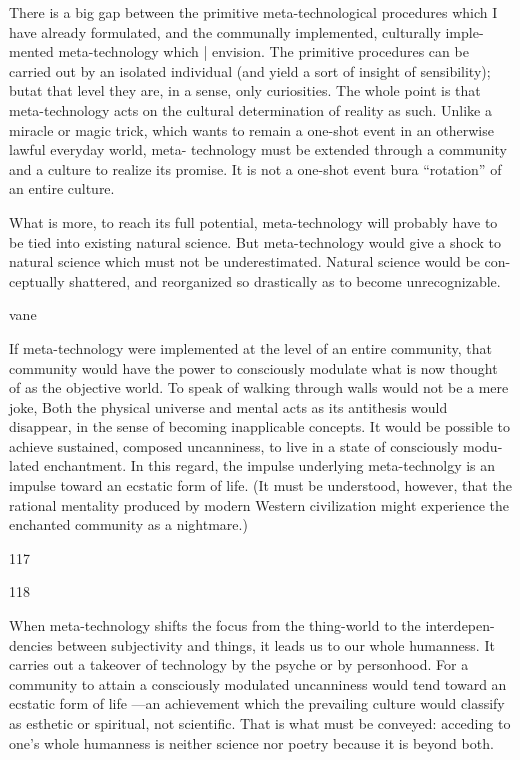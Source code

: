 There is a big gap between the primitive meta-technological procedures which I 
have already formulated, and the communally implemented, culturally imple- 
mented meta-technology which | envision. The primitive procedures can be 
carried out by an isolated individual (and yield a sort of insight of sensibility); butat 
that level they are, in a sense, only curiosities. The whole point is that meta-technology 
acts on the cultural determination of reality as such. Unlike a miracle or magic trick, 
which wants to remain a one-shot event in an otherwise lawful everyday world, meta- 
technology must be extended through a community and a culture to realize its promise. It 
is not a one-shot event bura “rotation” of an entire culture. 


What is more, to reach its full potential, meta-technology will probably have to be 
tied into existing natural science. But meta-technology would give a shock to 
natural science which must not be underestimated. Natural science would be con- 
ceptually shattered, and reorganized so drastically as to become unrecognizable. 


vane 


If meta-technology were implemented at the level of an entire community, 
that community would have the power to consciously modulate what is now 
thought of as the objective world. To speak of walking through walls would not be a 
mere joke, Both the physical universe and mental acts as its antithesis would 
disappear, in the sense of becoming inapplicable concepts. It would be possible to 
achieve sustained, composed uncanniness, to live in a state of consciously modu- 
lated enchantment. In this regard, the impulse underlying meta-technolgy is an 
impulse toward an ecstatic form of life. (It must be understood, however, that the 
rational mentality produced by modern Western civilization might experience the 
enchanted community as a nightmare.) 


117 


118 


When meta-technology shifts the focus from the thing-world to the interdepen- 
dencies between subjectivity and things, it leads us to our whole humanness. It 
carries out a takeover of technology by the psyche or by personhood. For a 
community to attain a consciously modulated uncanniness would tend toward an 
ecstatic form of life —an achievement which the prevailing culture would classify as 
esthetic or spiritual, not scientific. That is what must be conveyed: acceding to 
one’s whole humanness is neither science nor poetry because it is beyond both. 



